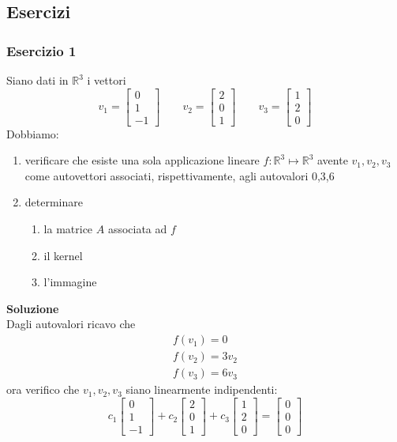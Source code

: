 \documentclass[italian]{article}
\newcommand{\ins}[1]{\text{$\mathbb{#1}$}}
\renewcommand{\ker}[1]{\text{ker$\left(#1\right)$}}
\newcommand{\imm}[1]{\text{Imm$\left(#1\right)$}}
\begin{document}
\newpage
\subsection{Esercizi}
\subsubsection{Esercizio 1}
Siano dati in $\ins{R}^3$ i vettori
\[
	v_1 = \begin{bmatrix}0\\1\\-1\end{bmatrix} 
	\qquad 
	v_2 = \begin{bmatrix}2\\0\\1\end{bmatrix}
	\qquad
	v_3 = \begin{bmatrix}1\\2\\0\end{bmatrix}
\]
Dobbiamo:
\begin{enumerate}[label=\alph*)]
	\item verificare che esiste una sola applicazione lineare $f: \ins{R}^3 \longmapsto \ins{R}^3$ avente $v_1,v_2,v_3$ come autovettori associati, rispettivamente, agli autovalori 0,3,6
	\item determinare
	\begin{enumerate}[label=\arabic*)]
		\item la matrice $A$ associata ad $f$
		\item il kernel \ker{f}
		\item l'immagine \imm{f}
	\end{enumerate}
\end{enumerate}
\textbf{Soluzione}\\[2mm]
Dagli autovalori ricavo che
\begin{gather*}
	f(v_1) = 0 \\
	f(v_2) = 3v_2 \\
	f(v_3) = 6v_3
\end{gather*}
ora verifico che $v_1,v_2,v_3$ siano linearmente indipendenti:
\[
	c_1\begin{bmatrix}0\\1\\-1\end{bmatrix} 
	+
	c_2\begin{bmatrix}2\\0\\1\end{bmatrix}
	+
	c_3\begin{bmatrix}1\\2\\0\end{bmatrix}
	=
	\begin{bmatrix}0\\0\\0\end{bmatrix}
\]
\end{document}
